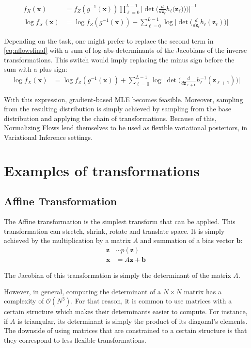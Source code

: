 \begin{align}
         f_X(\bm{x}) &= f_Z(g^{-1}(\bm{x}))\prod_{\ell=0}^{L-1}\Big|\det\Big(\frac{d}{d\bm{z_{\ell}}}h_{\ell}\Big(\bm{z_\ell})\Big)\Big)\Big|^{-1} \\
    \log f_X(\bm{x}) &= \log f_Z(g^{-1}(\bm{x})) - \sum_{\ell=0}^{L-1} \log \Big|\det\Big(\frac{d}{d\bm{z_{\ell}}}h_{\ell}(\bm{z_\ell})\Big) \Big| \label{eq:nflowsfinal}
\end{align}

Depending on the task, one might prefer to replace the second term in \ref{eq:nflowsfinal}
with a sum of log-abs-determinants of the Jacobians of the inverse transformations.
This switch would imply replacing the minus sign before the sum with a plus sign:
\begin{align}
    \log f_X(\bm{x}) &= \log f_Z(g^{-1}(\bm{x})) + \sum_{\ell=0}^{L-1} \log \Big|\det\Big(\frac{d}{d\bm{z_{\ell+1}}}h_{\ell}^{-1}(\bm{z_{\ell+1}})\Big) \Big|
\end{align}

With this expression, gradient-based MLE becomes feasible. Moreover, sampling
from the resulting distribution is simply achieved by sampling from the base
distribution and applying the chain of transformations. Because of this, Normalizing
Flows lend themselves to be used as flexible variational posteriors, in Variational
Inference settings.

\section{Examples of transformations}
\subsection{Affine Transformation}
The Affine transformation is the simplest transform that can be applied.
This transformation can stretch, shrink, rotate and translate space. It is simply
achieved by the multiplication by a matrix $A$ and summation of a bias vector $\bm{b}$:
\begin{align}
    \bm{z} &\sim p(\bm{z}) \\
    \bm{x} &= A\bm{z} + \bm{b}
\end{align}

The Jacobian of this transformation is simply the determinant of the matrix $A$.

However, in general, computing the determinant of a $N \times N$ matrix has a
complexity of $\mathcal{O}(N^3)$. For that reason, it is common to use matrices
with a certain structure which makes their determinants easier to compute. For
instance, if $A$ is triangular, its determinant is simply the product of its
diagonal's elements. The downside of using matrices that are constrained to
a certain structure is that they correspond to less flexible transformations.

